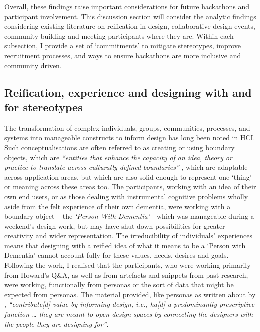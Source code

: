 Overall, these findings raise important considerations for future hackathons and participant involvement. This discussion section will consider the analytic findings considering existing literature on reification in design, collaborative design events, community building and meeting participants where they are. Within each subsection, I provide a set of `commitments' to mitigate stereotypes, improve recruitment processes, and ways to ensure hackathons are more inclusive and community driven. 

\subsection{Reification, experience and designing with and for stereotypes}
\label{DiscussionPartOne}
The transformation of complex individuals, groups, communities, processes, and systems into manageable constructs to inform design has long been noted in HCI. Such conceptualisations are often referred to as creating or using boundary objects, which are \textit{``entities that enhance the capacity of an idea, theory or practice to translate across culturally defined boundaries''} \cite[p.71]{fox2011boundary}, which are adaptable across application areas, but which are also solid enough to represent one `thing' or meaning across these areas too. The participants, working with an idea of their own end users, or as those dealing with instrumental cognitive problems wholly aside from the felt experience of their own dementia, were working with a boundary object – the \textit{`Person With Dementia'} - which was manageable during a weekend's design work, but may have shut down possibilities for greater creativity and wider representation. The irreducibility of individuals’ experiences means that designing with a reified idea of what it means to be a `Person with Dementia' cannot account fully for these values, needs, desires and goals. Following the work, I realised that the participants, who were working primarily from Howard’s Q\&A, as well as from artefacts and snippets from past research, were working, functionally from personas or the sort of data that might be expected from personas. The material provided, like personas as written about by \cite{marsden_stereotypes_2016}, \textit{``contribute[d] value by informing design, i.e., ha[d] a predominantly prescriptive function … they are meant to open design spaces by connecting the designers with the people they are designing for''}. 

